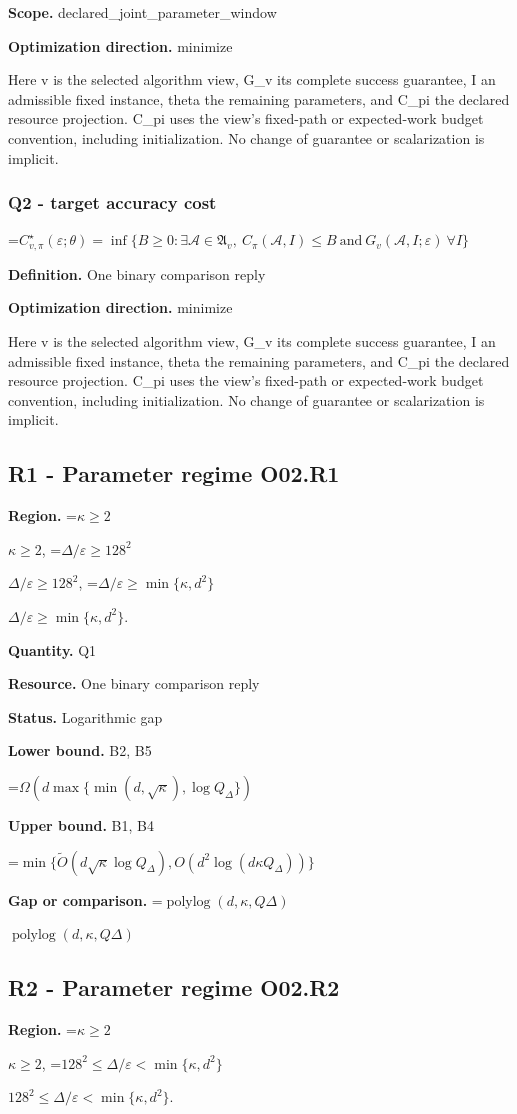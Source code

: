 \documentclass[10pt,a4paper]{article}
\newcommand{\AtlasMath}[1]{\par\begingroup\centering\setbox0=\hbox{$\displaystyle #1$}\ifdim\wd0>1.4\linewidth\typeout{ATLAS WIDE FORMULA: \the\wd0}\fi\ifdim\wd0>\linewidth\resizebox{\linewidth}{!}{\box0}\else\box0\fi\par\endgroup}
\newcommand{\AtlasInlineMath}[1]{\begingroup\setbox0=\hbox{$#1$}\ifdim\wd0>.4\linewidth\endgroup\AtlasMath{#1}\else\endgroup$#1$\fi}
\begin{document}
\textbf{Scope.} declared\_joint\_parameter\_window

\textbf{Optimization direction.} minimize

Here v is the selected algorithm view, G\_v its complete success guarantee, I an admissible fixed instance, theta the remaining parameters, and C\_pi the declared resource projection. C\_pi uses the view's fixed-path or expected-work budget convention, including initialization. No change of guarantee or scalarization is implicit.

\subsubsection{Q2 - target accuracy cost}
\AtlasMath{C^\star_{v,\pi}(\varepsilon;\theta)=\inf\{B\ge0:\exists\mathcal A\in\mathfrak A_v,\ C_\pi(\mathcal A,I)\le B\ \text{and}\ G_v(\mathcal A,I;\varepsilon)\ \forall I\}}
\textbf{Definition.} One binary comparison reply

\textbf{Optimization direction.} minimize

Here v is the selected algorithm view, G\_v its complete success guarantee, I an admissible fixed instance, theta the remaining parameters, and C\_pi the declared resource projection. C\_pi uses the view's fixed-path or expected-work budget convention, including initialization. No change of guarantee or scalarization is implicit.

\subsection{R1 - Parameter regime O02.R1}
\textbf{Region.} \AtlasInlineMath{\kappa\ge2}, \AtlasInlineMath{\Delta/\varepsilon\ge128^2}, \AtlasInlineMath{\Delta/\varepsilon\ge\min\{\kappa,d^2\}}.

\textbf{Quantity.} Q1

\textbf{Resource.} One binary comparison reply

\textbf{Status.} Logarithmic gap

\textbf{Lower bound.} B2, B5

\AtlasMath{\Omega(d\max\{\min(d,\sqrt\kappa),\log Q_\Delta\})}
\textbf{Upper bound.} B1, B4

\AtlasMath{\min\{\widetilde{O}(d\sqrt\kappa\log Q_\Delta),O(d^2\log(d\kappa Q_\Delta))\}}
\textbf{Gap or comparison.} \AtlasInlineMath{\operatorname{polylog}(d,\kappa ,Q\Delta )}

\subsection{R2 - Parameter regime O02.R2}
\textbf{Region.} \AtlasInlineMath{\kappa\ge2}, \AtlasInlineMath{128^2\le\Delta/\varepsilon<\min\{\kappa,d^2\}}.
\end{document}
